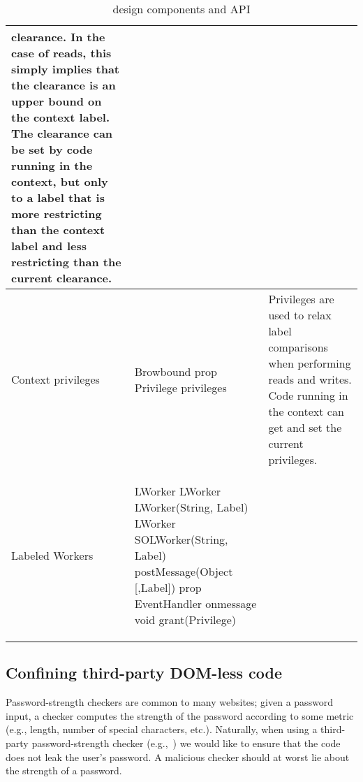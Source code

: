 \begin{table*}[t]
\begin{tabular}{l | m{2.35in} | m{3.5in}}
clearance.
%
In the case of reads, this simply implies that the clearance is an
upper bound on the context label.
%
The clearance can be set by code running in the context, but only to a
label that is more restricting than the context label and less
restricting than the current clearance.
\\\hline %
Context privileges  &  
\begin{webidl}
Browbound {
  prop Privilege privileges
}
\end{webidl}
&
Privileges are used to relax label comparisons when performing reads
and writes.
%
Code running in the context can get and set the current privileges.
\\\hline %
Labeled Workers  &  
\begin{webidl}
LWorker {
  LWorker LWorker(String, Label)
  LWorker SOLWorker(String, Label)
  postMessage(Object [,Label])
  prop EventHandler onmessage
  void grant(Privilege)
}
\end{webidl}
&
\\\hline %
\end{tabular}
\caption{\label{systemAPI} \sys{} design components and API}
\end{table*}


\subsection{Confining third-party DOM-less code}
\label{sec:system:worker}

Password-strength checkers are common to many websites;
%
given a password input, a checker computes the strength of the
password according to some metric (e.g., length, number of special
characters, etc.).
%
Naturally, when using a third-party password-strength checker
(e.g.,~) we would like to ensure that the
code does not leak the user's password.
%
A malicious checker should at worst lie about the strength of a
password.

